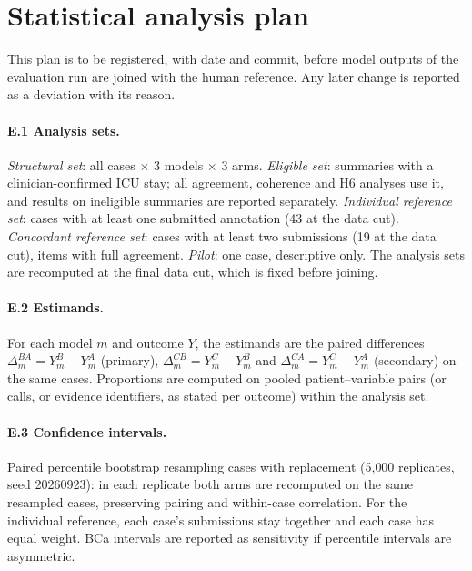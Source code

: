\section{Statistical analysis plan}\label{app:stats}

This plan is to be registered, with date and commit, before model outputs of the evaluation run are joined with
the human reference. Any later change is reported as a deviation with its reason.

\paragraph{E.1 Analysis sets.} \emph{Structural set}: all cases $\times$ 3 models $\times$ 3 arms.
\emph{Eligible set}: summaries with a clinician-confirmed ICU stay; all agreement, coherence and H6 analyses use
it, and results on ineligible summaries are reported separately. \emph{Individual reference
set}: cases with at least one submitted annotation (43 at the data cut). \emph{Concordant reference set}: cases with at
least two submissions (19 at the data cut), items with full agreement. \emph{Pilot}: one case, descriptive only.
The analysis sets are recomputed at the final data cut, which is fixed  before joining.

\paragraph{E.2 Estimands.} For each model $m$ and outcome $Y$, the estimands are the paired differences
$\Delta^{BA}_m = Y_m^{B} - Y_m^{A}$ (primary), $\Delta^{CB}_m = Y_m^{C} - Y_m^{B}$ and $\Delta^{CA}_m = Y_m^{C} - Y_m^{A}$
(secondary) on the same cases. Proportions are computed on pooled patient--variable pairs (or calls, or evidence
identifiers, as stated per outcome) within the analysis set.

\paragraph{E.3 Confidence intervals.} Paired percentile bootstrap resampling cases with replacement (5{,}000
replicates, seed 20260923): in each replicate both arms are recomputed on the same resampled cases, preserving
pairing and within-case correlation. For the individual reference, each case's submissions stay together and each
case has equal weight. BCa intervals are reported as sensitivity if percentile intervals are asymmetric.

